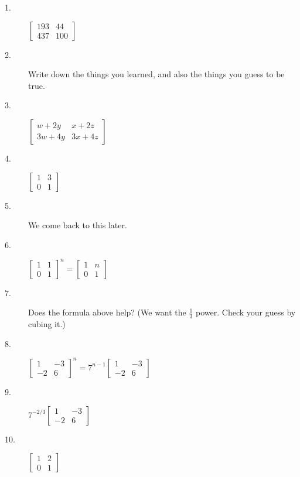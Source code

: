 \documentclass{article}
\begin{document}
\begin{description}

  \item[1.] $\begin{bmatrix} 193 & 44 \\ 437 & 100 \end{bmatrix}$

  \item[2.] Write down the things you learned, and also the things you guess to be true. 

  \item[3.] $\begin{bmatrix} w+2y & x+2z \\ 3w+4y & 3x+4z \end{bmatrix}$

  \item[4.] $\begin{bmatrix} 1 & 3 \\ 0 & 1 \end{bmatrix}$

  \item[5.] We come back to this later.

  \item[6.] $\begin{bmatrix} 1 & 1 \\ 0 & 1 \end{bmatrix}^n = \begin{bmatrix} 1 & n \\ 0 & 1 \end{bmatrix}$

  \item[7.] Does the formula above help? (We want the $\frac{1}{3}$ power. Check your guess by cubing it.) 

  \item[8.] $\begin{bmatrix} 1 & -3 \\ -2 & 6 \end{bmatrix}^n = 7^{n-1} \begin{bmatrix} 1 & -3 \\ -2 & 6 \end{bmatrix}$

  \item[9.] $7^{-2/3} \begin{bmatrix} 1 & -3 \\ -2 & 6 \end{bmatrix}$

  \item[10.] $\begin{bmatrix} 1 & 2 \\ 0 & 1 \end{bmatrix}$


\end{description}
\end{document}
